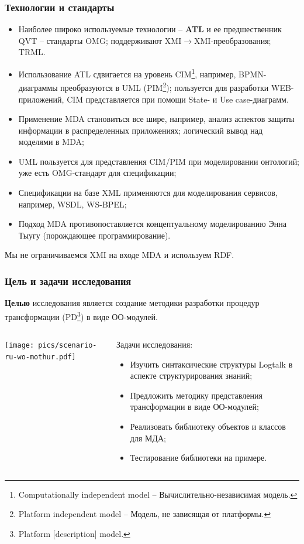 \documentclass[10pt]{beamer}
\begin{document}
\begin{frame}
  \frametitle{Технологии и стандарты}
  \begin{itemize}
  \item Наиболее широко используемые технологии -- \textbf{ATL} и ее предшественник QVT -- стандарты OMG; поддерживают XMI$\to$XMI-преобразования; TRML.
  \item Использование ATL сдвигается на уровень CIM\footnote{Computationally independent model -- Вычислительно-независимая модель.}, например, BPMN-диаграммы преобразуются в UML (PIM\footnote{Platform independent model -- Модель, не зависящая от платформы.}); пользуется для разработки WEB-приложений, CIM представляется при помощи State- и Use case-диаграмм.
  \item Применение MDA становиться все шире, например, анализ аспектов защиты информации в распределенных приложениях; логический вывод над моделями в MDA;
  \item UML пользуется для представления CIM/PIM при моделировании онтологий; уже есть OMG-стандарт для спецификации;
  \item Спецификации на базе XML применяются для моделирования сервисов, например, WSDL, WS-BPEL;
  \item Подход MDA противопоставляется концептуальному моделированию Энна Тыугу (порождающее программирование).
  \end{itemize}

  Мы не ограничиваемся XMI на входе MDA и используем RDF.\\[0.3em]

\end{frame}

\begin{frame}
  \frametitle{Цель и задачи исследования}
  \begin{block}{}
    \textbf{Целью} исследования является создание методики разработки процедур трансформации (PD\footnote{Platform [description] model.}) в виде ОО-модулей.
  \end{block}
  \begin{columns}
    \begin{column}{0.5\linewidth}
      \texttt{[image: pics/scenario-ru-wo-mothur.pdf]}
    \end{column}
    \begin{column}{0.6\linewidth}
      Задачи исследования:
      \begin{itemize}
      \item Изучить синтаксические структуры Logtalk в аспекте структурирования знаний;
      \item Предложить методику представления трансформации в виде ОО-модулей;
      \item Реализовать библиотеку объектов и классов для МДА;
      \item Тестирование библиотеки на примере.
      \end{itemize}
    \end{column}
  \end{columns}
\end{frame}
\end{document}
